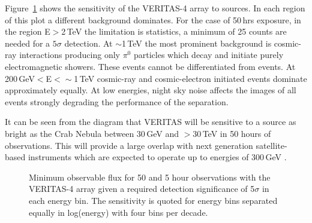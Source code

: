 Figure~\ref{FIG::VERITAS::SENSITIVITY} shows the sensitivity of the
VERITAS-4 array to \Gray sources. In each region of this plot a
different background dominates. For the case of 50\,hrs exposure, in
the region E$>$2\,TeV the limitation is \Gray statistics, a minimum of
25 counts are needed for a $5\sigma$ detection. At $\sim$1\,TeV the
most prominent background is cosmic-ray interactions producing only
$\pi^0$ particles which decay and initiate purely electromagnetic
showers. These events cannot be differentiated from \Gray events. At
200\,GeV$<$E$<\sim$1\,TeV cosmic-ray and cosmic-electron initiated
events dominate approximately equally. At low energies, night sky
noise affects the images of all events strongly degrading the
performance of the \Gray separation.

It can be seen from the diagram that VERITAS will be sensitive to a
source as bright as the Crab Nebula between 30\,GeV and $>$30\,TeV in
50 hours of observations. This will provide a large overlap with
next generation satellite-based instruments which are expected to
operate up to energies of 300\,GeV 
\citep{REF::NASA::2001GLASTPROPOSAL}.

\begin{figure}[t]
\caption{\label{FIG::VERITAS::SENSITIVITY} Minimum observable \Gray flux
for 50 and 5 hour observations with the VERITAS-4 array given a
required detection significance of 5$\sigma$ in each energy bin. The
sensitivity is quoted for energy bins separated equally in log(energy)
with four bins per decade.}
\end{figure}

